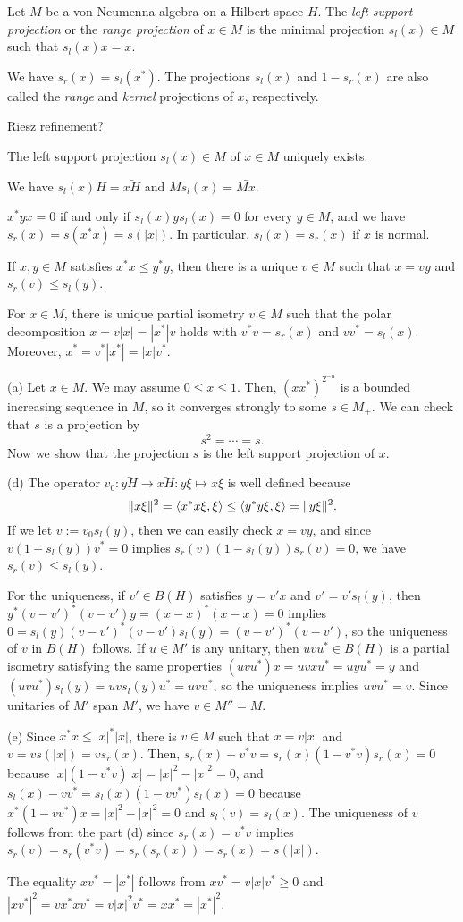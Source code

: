 \documentclass{../../large}
\begin{document}
\begin{prb}
Let $M$ be a von Neumenna algebra on a Hilbert space $H$.
The \emph{left support projection} or the \emph{range projection} of $x\in M$ is the minimal projection $s_l(x)\in M$ such that $s_l(x)x=x$.

We have $s_r(x)=s_l(x^*)$.
The projections $s_l(x)$ and $1-s_r(x)$ are also called the \emph{range} and \emph{kernel} projections of $x$, respectively.

Riesz refinement?
\begin{parts}
\item The left support projection $s_l(x)\in M$ of $x\in M$ uniquely exists.
\item We have $s_l(x)H=\bar{xH}$ and $Ms_l(x)=\bar{Mx}$.
\item $x^*yx=0$ if and only if $s_l(x)ys_l(x)=0$ for every $y\in M$, and we have $s_r(x)=s(x^*x)=s(|x|)$. In particular, $s_l(x)=s_r(x)$ if $x$ is normal.
\item If $x,y\in M$ satisfies $x^*x\le y^*y$, then there is a unique $v\in M$ such that $x=vy$ and $s_r(v)\le s_l(y)$.
\item For $x\in M$, there is unique partial isometry $v\in M$ such that the polar decomposition $x=v|x|=|x^*|v$ holds with $v^*v=s_r(x)$ and $vv^*=s_l(x)$. Moreover, $x^*=v^*|x^*|=|x|v^*$.
\end{parts}
\end{prb}
\begin{pf}
(a)
Let $x\in M$.
We may assume $0\le x\le1$.
Then, $(xx^*)^{2^{-n}}$ is a bounded increasing sequence in $M$, so it converges strongly to some $s\in M_+$.
We can check that $s$ is a projection by
\[s^2=\cdots=s.\]
Now we show that the projection $s$ is the left support projection of $x$.

(d)
The operator $v_0:\bar{yH}\to\bar{xH}:y\xi\mapsto x\xi$ is well defined because
\[\|x\xi\|^2=\langle x^*x\xi,\xi\rangle\le\langle y^*y\xi,\xi\rangle=\|y\xi\|^2.\]
If we let $v:=v_0s_l(y)$, then we can easily check $x=vy$, and since $v(1-s_l(y))v^*=0$ implies $s_r(v)(1-s_l(y))s_r(v)=0$, we have $s_r(v)\le s_l(y)$.

For the uniqueness, if $v'\in B(H)$ satisfies $y=v'x$ and $v'=v's_l(y)$, then $y^*(v-v')^*(v-v')y=(x-x)^*(x-x)=0$ implies $0=s_l(y)(v-v')^*(v-v')s_l(y)=(v-v')^*(v-v')$, so the uniqueness of $v$ in $B(H)$ follows.
If $u\in M'$ is any unitary, then $uvu^*\in B(H)$ is a partial isometry satisfying the same properties $(uvu^*)x=uvxu^*=uyu^*=y$ and $(uvu^*)s_l(y)=uvs_l(y)u^*=uvu^*$, so the uniqueness implies $uvu^*=v$.
Since unitaries of $M'$ span $M'$, we have $v\in M''=M$.

(e)
Since $x^*x\le|x|^*|x|$, there is $v\in M$ such that $x=v|x|$ and $v=vs(|x|)=vs_r(x)$.
Then, $s_r(x)-v^*v=s_r(x)(1-v^*v)s_r(x)=0$ because $|x|(1-v^*v)|x|=|x|^2-|x|^2=0$, and $s_l(x)-vv^*=s_l(x)(1-vv^*)s_l(x)=0$ because $x^*(1-vv^*)x=|x|^2-|x|^2=0$ and $s_l(v)=s_l(x)$.
The uniqueness of $v$ follows from the part (d) since $s_r(x)=v^*v$ implies $s_r(v)=s_r(v^*v)=s_r(s_r(x))=s_r(x)=s(|x|)$.

The equality $xv^*=|x^*|$ follows from $xv^*=v|x|v^*\ge0$ and $|xv^*|^2=vx^*xv^*=v|x|^2v^*=xx^*=|x^*|^2$.
\end{pf}
\end{document}
